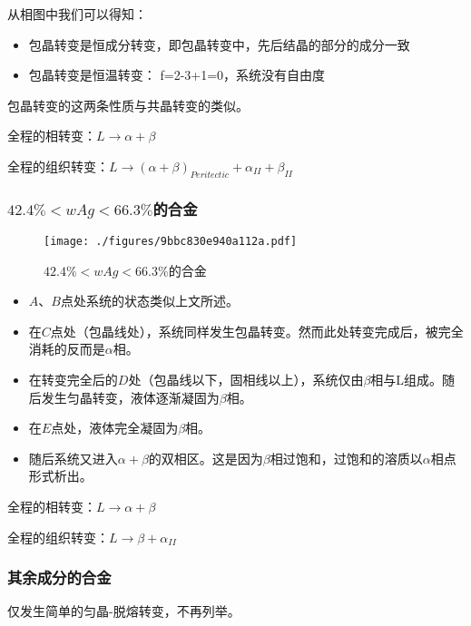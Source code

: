 从相图中我们可以得知：
\begin{itemize}
\item 包晶转变是恒成分转变，即包晶转变中，先后结晶的部分的成分一致
\item 包晶转变是恒温转变： f=2-3+1=0，系统没有自由度
\end{itemize}
包晶转变的这两条性质与共晶转变的类似。

全程的相转变：$L \rightarrow \alpha+\beta$

全程的组织转变：$L \rightarrow (\alpha+\beta)_{Peritectic} + \alpha_{II} + \beta_{II}$








\subsubsection{$42.4\%<wAg<66.3\%$的合金}
\begin{figure}[ht]
\centering
\texttt{[image: ./figures/9bbc830e940a112a.pdf]}
\caption{$42.4\%<wAg<66.3\%$的合金} \label{fig_PERITC_5}
\end{figure}

\begin{itemize}
\item $A$、$B$点处系统的状态类似上文所述。
\item 在$C$点处（包晶线处），系统同样发生包晶转变。然而此处转变完成后，被完全消耗的反而是$\alpha$相。
\item 在转变完全后的$D$处（包晶线以下，固相线以上），系统仅由$\beta$相与L组成。随后发生匀晶转变，液体逐渐凝固为$\beta$相。
\item 在$E$点处，液体完全凝固为$\beta$相。
\item 随后系统又进入$\alpha+\beta$的双相区。这是因为$\beta$相过饱和，过饱和的溶质以$\alpha$相点形式析出。
\end{itemize}

全程的相转变：$L \rightarrow \alpha+\beta$

全程的组织转变：$L \rightarrow \beta + \alpha_{II}$

\subsubsection{其余成分的合金}
仅发生简单的匀晶-脱熔转变，不再列举。

